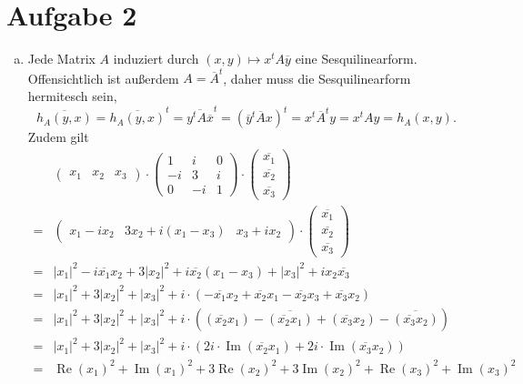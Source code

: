 \documentclass{article}
\theoremstyle{definition}
\newcommand{\re}{\operatorname{Re}}
\newcommand{\Ima}{\operatorname{Im}}
\begin{document}
\section{Aufgabe 2}
\begin{enumerate}[(a)]
	\item Jede Matrix $A$ induziert durch $(x,y) \mapsto x^tA\overline{y}$ eine Sesquilinearform. Offensichtlich ist außerdem $A = \overline{A}^t$, daher muss die Sesquilinearform hermitesch sein, $$\overline{h_A(y,x)} = \overline{h_A(y,x)}^t = \overline{y^tA\overline{x}}^t = (\overline{y}^t \overline{A} x)^t = x^t\overline{A}^ty = x^tAy = h_A(x,y).$$ Zudem gilt 
	\begin{align*}
		&\begin{pmatrix}
			x_1 & x_2 & x_3
		\end{pmatrix} \cdot \begin{pmatrix}
			1 & i & 0\\
			-i & 3 & i\\
			0 & -i & 1
		\end{pmatrix} \cdot \begin{pmatrix}
			\overline{x_1}\\
			\overline{x_2}\\
			\overline{x_3}
		\end{pmatrix}\\
		=& \begin{pmatrix}
			x_1 - i x_2 & 3 x_2 + i (x_1 - x_3) & x_3 + i x_2
		\end{pmatrix} \cdot \begin{pmatrix}
			\overline{x_1}\\
			\overline{x_2}\\
			\overline{x_3}
		\end{pmatrix}\\
		=& |x_1|^2 - i \overline{x_1}x_2 + 3|x_2|^2 + i \overline{x_2}(x_1-x_3) + |x_3|^2 + i x_2\overline{x_3}\\
		=& |x_1|^2 + 3|x_2|^2 + |x_3|^2 + i \cdot (-\overline{x_1}x_2 + \overline{x_2}x_1 - \overline{x_2}x_3 + \overline{x_3}x_2)\\
		=& |x_1|^2 + 3|x_2|^2 + |x_3|^2 + i \cdot ((\overline{x_2}x_1) - \overline{(\overline{x_2}x_1)} + (\overline{x_3}x_2) - \overline{(\overline{x_3}x_2)})\\
		=& |x_1|^2 + 3|x_2|^2 + |x_3|^2 + i \cdot (2i \cdot \Ima(\overline{x_2}x_1) + 2i \cdot \Ima(\overline{x_3}x_2))\\
		=& \re(x_1)^2 + \Ima(x_1)^2 + 3\re(x_2)^2 + 3\Ima(x_2)^2 + \re(x_3)^2 + \Ima(x_3)^2\\

\end{align*}
\end{enumerate}
\end{document}
